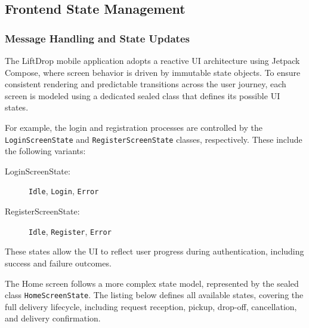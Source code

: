 \subsection{Frontend State Management}

\subsubsection{Message Handling and State Updates}

The LiftDrop mobile application adopts a reactive UI architecture using Jetpack Compose, where screen behavior is driven by immutable state objects. To ensure consistent rendering and predictable transitions across the user journey, each screen is modeled using a dedicated sealed class that defines its possible UI states.

For example, the login and registration processes are controlled by the \texttt{LoginScreenState} and \texttt{RegisterScreenState} classes, respectively. These include the following variants:

\begin{description}
    \item[LoginScreenState:] \texttt{Idle}, \texttt{Login}, \texttt{Error}
    \item[RegisterScreenState:] \texttt{Idle}, \texttt{Register}, \texttt{Error}
\end{description}

These states allow the UI to reflect user progress during authentication, including success and failure outcomes.

The Home screen follows a more complex state model, represented by the sealed class \texttt{HomeScreenState}. The listing below defines all available states, covering the full delivery lifecycle, including request reception, pickup, drop-off, cancellation, and delivery confirmation.

